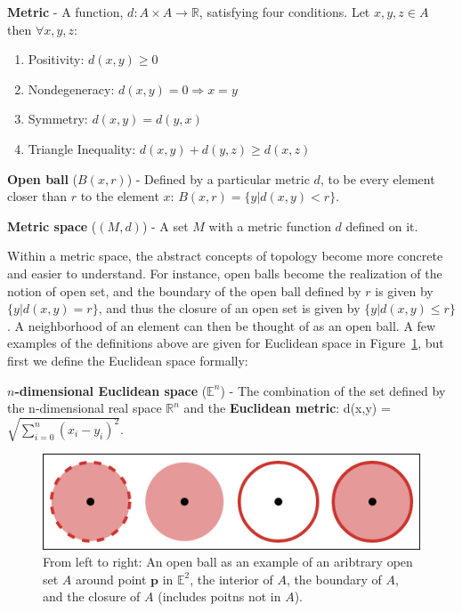 \begin{defn}
  \textbf{Metric} - A function, $d: A \times A \rightarrow \mathbb{R}$,
  satisfying four conditions. Let $x,y,z \in A$ then $\forall x,y,z$:
  \begin{enumerate}
  \item Positivity: $d(x, y) \ge 0$
  \item Nondegeneracy: $d(x, y)=0 \Rightarrow x=y$
  \item Symmetry: $d(x, y) = d(y, x)$
  \item Triangle Inequality: $d(x, y) + d(y, z) \ge d(x, z)$
  \end{enumerate}
\end{defn}
\begin{defn}
  \textbf{Open ball} ($B(x,r)$) - Defined by a particular metric $d$, to be
  every element closer than $r$ to the element $x$: $B(x,r) = \{y| d(x,y) < r\}$.
\end{defn}
\begin{defn}
  \textbf{Metric space} ($(M,d)$) - A set $M$ with a metric function $d$ defined on it.
\end{defn}

Within a metric space, the abstract concepts of topology become more concrete and easier to understand.
%
For instance, open balls become the realization of the notion of open set, and the boundary of the open ball defined by $r$ is given by $\{y| d(x,y) = r\}$, and thus the closure of an open set is given by $\{y| d(x,y) \leq r\}$.
%
A neighborhood of an element can then be thought of as an open ball.
%
A few examples of the definitions above are given for Euclidean space in Figure~\ref{fig:sets}, but first we define the Euclidean space formally:

\begin{defn}
  \textbf{$n$-dimensional Euclidean space} ($\mathbb{E}^n$) - The combination of
  the set defined by the n-dimensional real space $\mathbb{R}^n$ and the
  \textbf{Euclidean metric}: d(x,y) = $\sqrt{\sum_{i=0}^n(x_i-y_i)^2}$.
\end{defn}

\begin{figure}[b]
  \centering
  \includegraphics[width=.75\textwidth]{figs/chap2/openSet}
  \caption[Open ball as an example of an open set]{From left to right: An open
  ball as an example of an aribtrary open set $A$ around point
  $\mathbf{p}$ in $\mathbb{E}^2$, the interior of $A$, the boundary of
  $A$, and the closure of $A$ (includes poitns not in $A$).}
  \label{fig:sets}
\end{figure}

